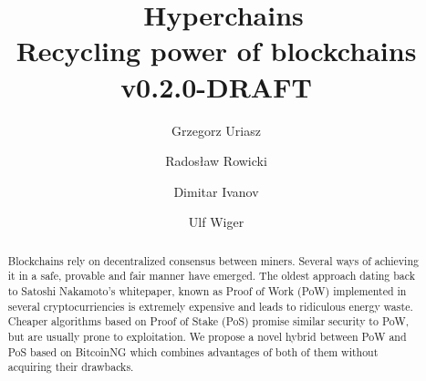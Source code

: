 \documentclass{article}
\title{\huge \Aet\ Hyperchains \\[0.5em]
  \large Recycling power of blockchains
  \\[1em] v0.2.0-DRAFT }
\author{ Grzegorz Uriasz
  \and Radosław Rowicki
  \and Dimitar Ivanov
  \and Ulf Wiger
}
\begin{document}
\maketitle

\begin{abstract}
  Blockchains rely on decentralized consensus between miners. Several ways of
  achieving it in a safe, provable and fair manner have emerged. The oldest
  approach dating back to Satoshi Nakamoto's whitepaper, known as Proof of Work
  (PoW) implemented in several cryptocurriencies is extremely expensive and
  leads to ridiculous energy waste. Cheaper algorithms based on Proof of Stake (PoS)
  promise similar security to PoW, but are usually prone to exploitation. We
  propose a novel hybrid between PoW and PoS based on BitcoinNG which combines
  advantages of both of them without acquiring their drawbacks.
\end{abstract}

\tableofcontents

\newpage







 
\end{document}
